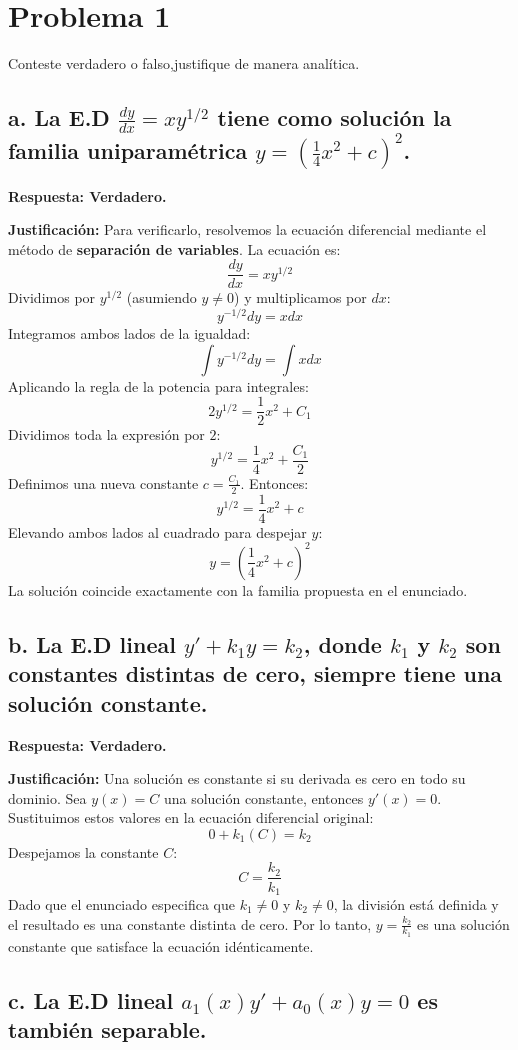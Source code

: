 \documentclass[a4paper]{article}
\begin{document}
\section*{Problema 1}
Conteste verdadero o falso,justifique de manera analítica.

\subsection*{a. La E.D $\frac{dy}{dx} = xy^{1/2}$ tiene como solución la familia uniparamétrica $y = (\frac{1}{4} x^2 + c)^2$.}

\textbf{Respuesta: Verdadero.}

\textbf{Justificación:}
Para verificarlo, resolvemos la ecuación diferencial mediante el método de \textbf{separación de variables}. La ecuación es:
$$\frac{dy}{dx} = x y^{1/2}$$
Dividimos por $y^{1/2}$ (asumiendo $y \neq 0$) y multiplicamos por $dx$:
$$y^{-1/2} dy = x dx$$
Integramos ambos lados de la igualdad:
$$\int y^{-1/2} dy = \int x dx$$
Aplicando la regla de la potencia para integrales:
$$2y^{1/2} = \frac{1}{2}x^2 + C_1$$
Dividimos toda la expresión por $2$:
$$y^{1/2} = \frac{1}{4}x^2 + \frac{C_1}{2}$$
Definimos una nueva constante $c = \frac{C_1}{2}$. Entonces:
$$y^{1/2} = \frac{1}{4}x^2 + c$$
Elevando ambos lados al cuadrado para despejar $y$:
$$y = \left( \frac{1}{4}x^2 + c \right)^2$$
La solución coincide exactamente con la familia propuesta en el enunciado.

\subsection*{b. La E.D lineal $y' + k_1 y = k_2$, donde $k_1$ y $k_2$ son constantes distintas de cero, siempre tiene una solución constante.}

\textbf{Respuesta: Verdadero.}

\textbf{Justificación:}
Una solución es constante si su derivada es cero en todo su dominio. Sea $y(x) = C$ una solución constante, entonces $y'(x) = 0$. Sustituimos estos valores en la ecuación diferencial original:
$$0 + k_1(C) = k_2$$
Despejamos la constante $C$:
$$C = \frac{k_2}{k_1}$$
Dado que el enunciado especifica que $k_1 \neq 0$ y $k_2 \neq 0$, la división está definida y el resultado es una constante distinta de cero. Por lo tanto, $y = \frac{k_2}{k_1}$ es una solución constante que satisface la ecuación idénticamente.

\subsection*{c. La E.D lineal $a_1(x)y' + a_0(x)y = 0$ es también separable.}
\end{document}
